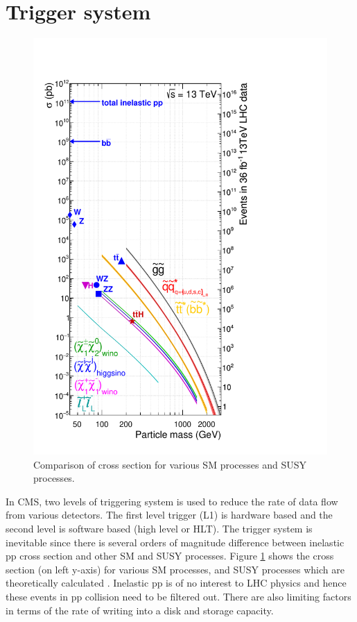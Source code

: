 \section{Trigger system}																			
\begin{figure}
\includegraphics[width=0.9\linewidth]{../Figures/Chap2/xsec13TeV_36_SM}
\captionsetup{width=.9\linewidth}
\caption[SM cross section vs SUSY cross section]{Comparison of cross section for various SM processes and SUSY processes.}\label{fig:xsec13TeV_36_SM}
\end{figure}
In CMS, two levels of triggering system is used to reduce the rate of data flow from various detectors. The first level trigger (L1) is hardware based and the second level is software based (high level or HLT). The trigger system is inevitable since there is several orders of magnitude difference between inelastic pp cross section and other SM and SUSY processes. Figure \ref{fig:xsec13TeV_36_SM} shows the cross section (on left y-axis) for various SM processes, and SUSY processes which are theoretically calculated \cite{Borschensky:2014cia}. Inelastic pp is of no interest to LHC physics and hence these events in pp collision need to be filtered out. There are also limiting factors in terms of the rate of writing into a disk and storage capacity.

